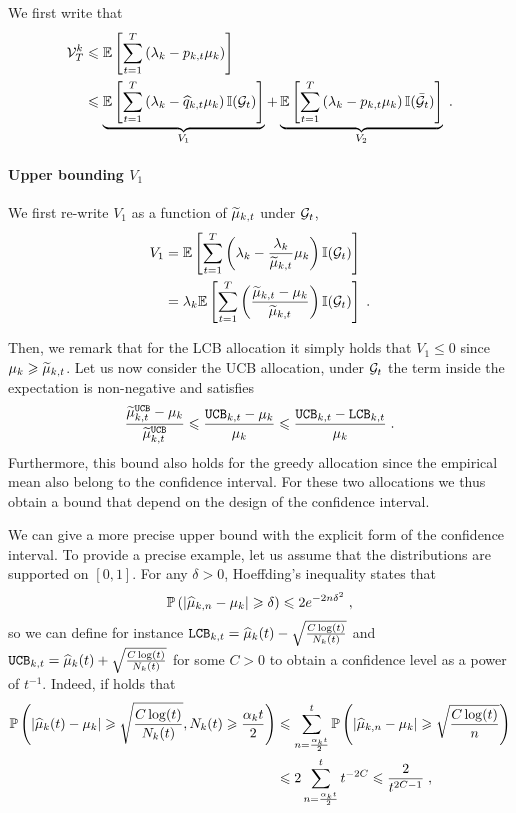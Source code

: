 We first write that 
\begin{align*}
\mathcal{V}_T^k &\leqslant \mathbb{E}\left[\sum_{t=1}^T \left(\lambda_k-p_{k, t} \mu_k \right)\right] \\
&
\leqslant  \underbrace{\mathbb{E}\left[\sum_{t=1}^T \left(\lambda_k-\widehat{q}_{k,t} \mu_k \right) \mathbb{I}(\mathcal{G}_t)\right]}_{V_1} + \underbrace{\mathbb{E}\left[\sum_{t=1}^T \left(\lambda_k-p_{k, t} \mu_k \right) \mathbb{I}(\bar {\mathcal{G}}_t)\right]}_{V_2} \;. \\
\end{align*}


\paragraph{Upper bounding $V_1$} We first re-write $V_1$ as a function of $\widetilde{\mu}_{k, t}$ under $\mathcal{G}_t$, 
\begin{align*}
V_1 & = \mathbb{E}\left[\sum_{t=1}^T \left(\lambda_k- \frac{\lambda_k}{\widetilde{\mu}_{k, t}} \mu_k \right) \mathbb{I}(\mathcal{G}_t)\right] \\
& = \lambda_k \mathbb{E}\left[\sum_{t=1}^T \left(\frac{\widetilde{\mu}_{k,t}-\mu_k}{\widetilde{\mu}_{k,t}}\right) \mathbb{I}(\mathcal{G}_t)\right]\;.
\end{align*}

Then, we remark that for the LCB allocation it simply holds that $V_1\leq 0$ since $\mu_k\geqslant \widetilde{\mu}_{k,t}$. Let us now consider the UCB allocation, under $\mathcal{G}_t$ the term inside the expectation is non-negative and satisfies 
\[\frac{\widetilde{\mu}_{k,t}^{\texttt{UCB}}-\mu_k}{\widetilde{\mu}_{k,t}^{\texttt{UCB}}} \leqslant \frac{\texttt{UCB}_{k,t}-\mu_k}{\mu_k} \leqslant \frac{\texttt{UCB}_{k,t}-\texttt{LCB}_{k, t}}{\mu_k} \;. \]
Furthermore, this bound also holds for the greedy allocation since the empirical mean also belong to the confidence interval. For these two allocations we thus obtain a bound that depend on the design of the confidence interval. 

We can give a more precise upper bound with the explicit form of the confidence interval. To provide a precise example, let us assume that the distributions are supported on $[0,1]$. For any $\delta>0$, Hoeffding's inequality states that 
\[\mathbb{P}\left(|\widehat{\mu}_{k, n}-\mu_k|\geqslant \delta \right)\leqslant 2e^{-2n\delta^2}\;, \]
so we can define for instance $\texttt{LCB}_{k,t} = \widehat{\mu}_k(t) - \sqrt{\frac{C\log(t)}{N_k(t)}} $ and $\texttt{UCB}_{k,t} = \widehat{\mu}_k(t) + \sqrt{\frac{C\log(t)}{N_k(t)}}$ for some $C>0$ to obtain a confidence level as a power of $t^{-1}$. Indeed, if holds that 
\begin{align*} \mathbb{P}\left(|\widehat{\mu}_k(t)- \mu_k|\geqslant \sqrt{\frac{C\log(t)}{N_k(t)}}, N_k(t)\geqslant \frac{\alpha_k t}{2} \right)&\leqslant \sum_{n=\frac{\alpha_k t}{2}}^t \mathbb{P}\left(|\widehat{\mu}_{k, n}- \mu_k|\geqslant \sqrt{\frac{C\log(t)}{n}}\right)  \\
&\leqslant 2 \sum_{n=\frac{\alpha_k t}{2}}^t t^{-2C}\leqslant \frac{2}{t^{2C-1}} \;,
\end{align*}

